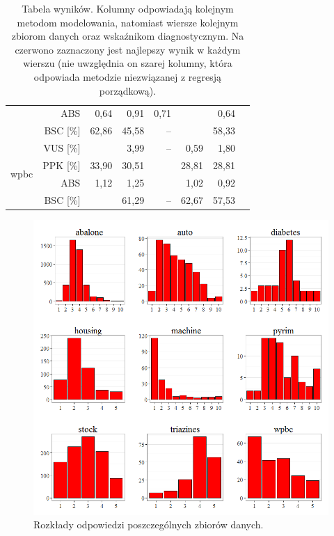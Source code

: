 \documentclass{mini}
\begin{document}
\begin{table}[!htbp]
\begin{tabular}{rrrrrrrr}
   & ABS \color{white}{[\%]} & 0,64 & 0,91 & 0,71 & \color{red}{0,61} & 0,64 &\color{gray}{0,88}\\ 
   & BSC [\%] & 62,86 & 45,58 & -- & \color{red}{66,46} & 58,33 &\color{gray}{42,49}\\ 
   \hline
\multirow{4}{15mm}{wpbc} & VUS [\%] & \color{red}{4,44} & 3,99 & -- & 0,59 & 1,80 &\color{gray}{0,00}\\ 
   & PPK [\%] & 33,90 & 30,51 & \color{red}{35,59} & 28,81 & 28,81 &\color{gray}{25,42}\\ 
   & ABS \color{white}{[\%]} & 1,12 & 1,25 & \color{red}{0,86} & 1,02 & 0,92 &\color{gray}{1,29}\\ 
   & BSC [\%] & \color{red}{67,59} & 61,29 & -- & 62,67 & 57,53 &\color{gray}{40,48}\\ 
   \hline
\end{tabular}
\caption{Tabela wyników. Kolumny odpowiadają kolejnym metodom modelowania, natomiast wiersze kolejnym zbiorom danych oraz wskaźnikom diagnostycznym. Na czerwono zaznaczony jest najlepszy wynik w każdym wierszu (nie uwzględnia on szarej kolumny, która odpowiada metodzie niezwiązanej z regresją porządkową).}
\label{wyniki} 
\end{table}

\begin{figure}[h!]
\begin{center}
\includegraphics[width=\textwidth]{graphics/rozklad_odpowiedzi.png}
\end{center}
\caption{Rozkłady odpowiedzi poszczególnych zbiorów danych.}
\label{rozkladdanych}
\end{figure}
\end{document}
